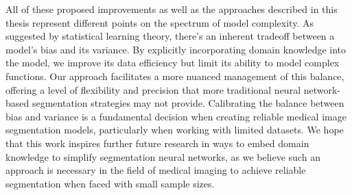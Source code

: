 All of these proposed improvements as well as the approaches described in this thesis represent different points on the spectrum of model complexity. As suggested by statistical learning theory, there's an inherent tradeoff between a model's bias and its variance. By explicitly incorporating domain knowledge into the model, we improve its data efficiency but limit its ability to model complex functions. Our approach facilitates a more nuanced management of this balance, offering a level of flexibility and precision that more traditional neural network-based segmentation strategies may not provide. Calibrating the balance between bias and variance is a fundamental decision when creating reliable medical image segmentation models, particularly when working with limited datasets. We hope that this work inspires further future research in ways to embed domain knowledge to simplify segmentation neural networks, as we believe such an approach is necessary in the field of medical imaging to achieve reliable segmentation when faced with small sample sizes.
